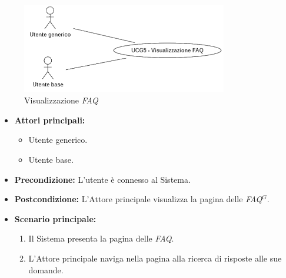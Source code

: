 \newpage
{}

\label{usecase:Visualizzazione FAQ}

\begin{figure}[h]
	\centering
	\includegraphics[width=0.8\textwidth]{./uml/UCG5.png}
	\caption{Visualizzazione \textit{FAQ}}
	\label{fig:UCG5}
\end{figure}

\begin{itemize}
	\item \textbf{Attori principali:}
	      \begin{itemize}
		      \item Utente generico.
		      \item Utente base.
	      \end{itemize}


	\item \textbf{Precondizione:}
	      L'utente è connesso al Sistema.

	\item \textbf{Postcondizione:} L'Attore principale visualizza la pagina delle \textit{\ac{FAQ}$^G$}.

	\item \textbf{Scenario principale:}
	      \begin{enumerate}
		      \item Il Sistema presenta la pagina delle \textit{\ac{FAQ}}.
		      \item L'Attore principale naviga nella pagina alla ricerca di risposte alle sue domande.

	      \end{enumerate}
\end{itemize}
